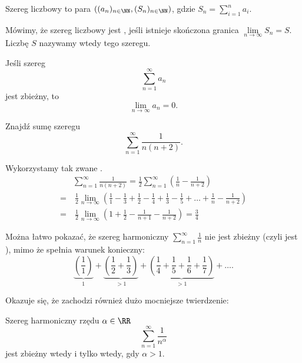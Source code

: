 \begin{definition}
    Szereg liczbowy to para $((a_n)_{n\in\NN}, (S_n)_{n\in\NN})$, gdzie $S_n = \sum_{i=1}^n a_i$.
\end{definition}

Mówimy, że szereg liczbowy jest , jeśli istnieje skończona granica $\lim\limits_{n\to\infty} S_n = S$. Liczbę $S$ nazywamy wtedy  tego szeregu.

\begin{theorem}
    \label{t:necessary condition of convergence}
    Jeśli szereg
    \[ \sum_{n = 1}^\infty a_n \]
    jest zbieżny, to
    \[ \lim_{n\to\infty} a_n = 0. \]
\end{theorem}

\begin{example}
    Znajdź sumę szeregu
    \[ \sum_{n=1}^\infty \frac{1}{n(n+2)}. \]
\end{example}
\begin{solution}
    Wykorzystamy tak zwane .
    \begin{align*}
        &\sum_{n=1}^\infty \frac{1}{n(n+2)} = \frac{1}{2}\sum_{n=1}^\infty \left(\frac{1}{n} - \frac{1}{n+2}\right) \\
        =&\ \frac{1}{2}\lim_{n\to\infty}\left(\frac{1}{1} - \frac{1}{3} + \frac{1}{2} - \frac{1}{4} + \frac{1}{3} - \frac{1}{5} + \ldots + \frac{1}{n} - \frac{1}{n+2}\right) \\
        =&\ \frac{1}{2}\lim_{n\to\infty}\left(1 + \frac{1}{2} - \frac{1}{n+1} - \frac{1}{n+2}\right) = \frac{3}{4}
    \end{align*}
\end{solution}

Można łatwo pokazać, że szereg harmoniczny $\sum_{n=1}^\infty \frac{1}{n}$ nie jest zbieżny (czyli jest ), mimo że spełnia warunek konieczny:
\[ \underbrace{\left(\frac{1}{1}\right)}_1 + \underbrace{\left(\frac{1}{2} + \frac{1}{3}\right)}_{>1} + \underbrace{\left(\frac{1}{4} + \frac{1}{5} + \frac{1}{6} + \frac{1}{7}\right)}_{>1} + \ldots .\]

Okazuje się, że zachodzi również dużo mocniejsze twierdzenie:
\begin{theorem}
    \label{t:harmonic series}
    Szereg harmoniczny rzędu $\alpha \in \RR$
    \[ \sum_{n=1}^\infty \frac{1}{n^\alpha} \]
    jest zbieżny wtedy i tylko wtedy, gdy $\alpha > 1$.
\end{theorem}

